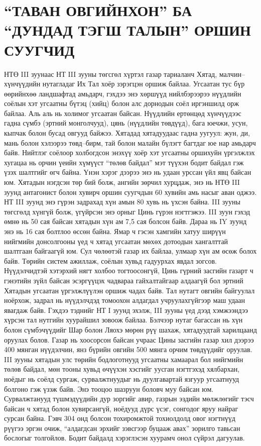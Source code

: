 \section{“ТАВАН ОВГИЙНХОН” БА “ДУНДАД ТЭГШ ТАЛЫН” ОРШИН СУУГЧИД}
НТӨ III зуунаас НТ III зууны төгсгөл хүртэл газар тариаланч Хятад, малчин–хүнчүүдийн нутагладаг Их Тал хоёр зэрэгцэн оршиж байлаа. Угсаатан тус бүр өөрийнхөө ландшафтад амьдарч, гэхдээ энэ хөршүүд нийлбэрээрээ нүүдлийн соёлын хэт угсаатны бүтэц (хийц) болон алс дорнодын соёл иргэншилд орж байлаа. Аль аль нь холимог угсаатан байсан. Нүүдлийн ертөнцөд хүнчүүдээс гадна сүмбэ (эртний монголчууд), цянь (нүүдлийн төвдүүд), бага юечжи, усун, кыпчак болон бусад овгууд байжээ. Хятадад хятадуудаас гадна уугуул: жун, ди, мань болон хэлээрээ төвд–бирм, тай болон малайн бүлэгт багтдаг юе нар амьдарч байв.
Нийтлэг соёлоор холбогдсон энэхүү хоёр хэт угсаатны оршихуйн үргэлжлэх хугацаа нь орчин үеийн хүмүүст “төлөв байдал” мэт түүхэн бодит байдал гэж үзэх шалтгийг өгч байна. Үнэн хэрэг дээрээ энэ нь удаан урссан үйл явц байсан юм. Хятадын нэгдсэн төр бий болж, ангийн зөрчил хурцдаж, энэ нь НТӨ III зуунд антагонист болон хувирч оршин суугчдын 60 хувийн амь насыг аван оджээ. НТ III зуунд энэ гүрэн задрахад хүн амын 80 хувь нь үхсэн байна. III зууны төгсгөлд хүнгүй болж, үгүйрсэн энэ орныг Цинь гүрэн нэгтгэжээ. III зуун гэхэд өмнө нь 50 сая байсан хятадын хүн ам 7,5 сая болсон байв. Дараа нь IY зуунд энэ нь 16 сая болтлоо өссөн байна.
Ямар ч гэсэн хамгийн хатуу ширүүн нийгмийн донсолгооны үед ч хятад угсаатан мөхөх дотоодын хангалттай шалтгаан байгаагүй юм. Сул чөлөөтэй газар их байлаа, улмаар хүн ам өсөж болох байв. Төрийн систем ажиллаж, соёлын хувьд гадуурхах явдал зогсов. Нүүдэлчидтэй хэтэрхий нягт холбоо тогтоосонгүй, Цинь гүрний засгийн газарт ч гэнэтийн зүйл байсан эсэргүүцэх чадвараа гайхалтайгаар алдаагүй бол эртний Хятадын угсаатан үргэлжлүүлэн оршиж чадах байв.
Тал нутагт овгийн байгуулал ноёрхож, задрал нь нүүдэлчдэд томоохон алдагдал учруулахгүйгээр маш удаан явагдаж байв. Гэхдээ тэднийг НТ I зуунд эхэлж, III зууны үед дээд хэмжээндээ хүрсэн тал нутгийн хуурайшил зовоож байлаа. Бэлчээр нутаг багассан нь хүн болон сүмбэчүүдийг Шар болон Ляохэ мөрөн рүү шахаж, хятадуудтай харилцаанд оруулах болов. Газар нь хоосорсон байсан учраас Цины засгийн газар хил дээрээ 400 мянган нүүдэлчин, янз бүрийн овгийн 500 мянга орчим төвдүүдийг оруулав. III зууны хятадын улс төрийн бодлоготнууд угсаатны хамаарал бол нийгмийн төлөв байдал, мөн тооны хувьд өчүүхэн хэсгийг уусган нэгтгэхэд хялбархан, ноёдыг нь соёлд сургаж, сурвалжтнуудыг нь дуулгавартай язгуур угсаатнууд болгоно гэж үзэж байв. Энэ тооцоо шазруун боловч муу байсан юм. Сурвалжтанууд түшмэдүүдийн дур зоргийг авир, газрын эздийн мөлжлөгийг тэсч байсан ч хятад болон хувирсангүй, ноёдууд дүрс үсэг, сонгодог яруу найраг сурсан байна. Гэвч 304 онд болсон тохиромжтой тохиолдолд овог нэгтнүүд рүүгээ эргэн очиж, “алдагдсан эрхийг зэвсгээр буцааж авах” зорилго тавьсан бослогыг толгойлов. Бодит байдалд хэрэглэсэн хуурамч онол сүйрэл дагуулав.
